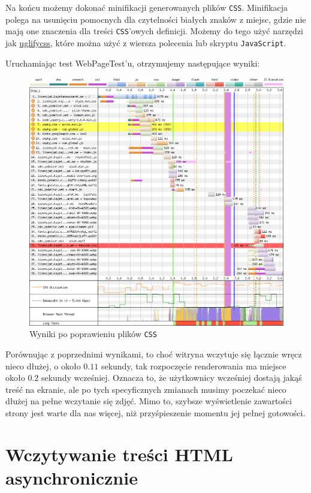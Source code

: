 \documentclass[licencjacka]{pracadypl}
\begin{document}
Na końcu możemy dokonać minifikacji generowanych plików \texttt{CSS}. Minifikacja polega na usunięciu pomocnych dla czytelności białych znaków z miejsc, gdzie nie mają one znaczenia dla treści \texttt{CSS}'owych definicji. Możemy do tego użyć narzędzi jak \href{https://www.npmjs.com/package/uglifycss}{uglifycss}, które można użyć z wiersza polecenia lub skryptu \texttt{JavaScript}.

Uruchamiając test WebPageTest'u, otrzymujemy następujące wyniki:

\begin{figure}[H]
  \centering
  \includegraphics[width=\linewidth]{images/waterfall-after-css.png}
  \caption{Wyniki po poprawieniu plików \texttt{CSS}}
  \label{fig:waterfall-after-css}
\end{figure}

Porównując z poprzednimi wynikami, to choć witryna wczytuje się łącznie wręcz nieco dłużej, o około $0.11$ sekundy, tak rozpoczęcie renderowania ma miejsce około $0.2$ sekundy wcześniej. Oznacza to, że użytkownicy wcześniej dostają jakąś treść na ekranie, ale po tych specyficznych zmianach musimy poczekać nieco dłużej na pełne wczytanie się zdjęć. Mimo to, szybsze wyświetlenie zawartości strony jest warte dla nas więcej, niż przyśpieszenie momentu jej pełnej gotowości.

\section{Wczytywanie treści HTML asynchronicznie}
\end{document}
